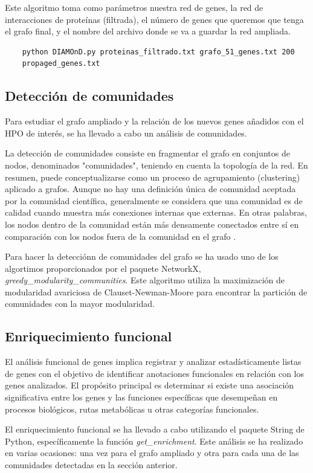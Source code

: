 Este algoritmo toma como parámetros nuestra red de genes, la red de interacciones de proteínas (filtrada), el número de genes que queremos que tenga el grafo final, y el nombre del archivo donde se va a guardar la red ampliada.

\begin{verbatim}
	python DIAMOnD.py proteinas_filtrado.txt grafo_51_genes.txt 200
	propaged_genes.txt
\end{verbatim}

\subsection{Detección de comunidades}

Para estudiar el grafo ampliado y la relación de los nuevos genes añadidos con el HPO de interés, se ha llevado a cabo un análisis de comunidades.

La detección de comunidades consiste en fragmentar el grafo en conjuntos de nodos, denominados "comunidades", teniendo en cuenta la topología de la red. En resumen, puede conceptualizarse como un proceso de agrupamiento (clustering) aplicado a grafos. Aunque no hay una definición única de comunidad aceptada por la comunidad científica, generalmente se considera que una comunidad es de calidad cuando muestra más conexiones internas que externas. En otras palabras, los nodos dentro de la comunidad están más densamente conectados entre sí en comparación con los nodos fuera de la comunidad en el grafo \cite{PanizoLledot}.

Para hacer la detecciónn de comunidades del grafo se ha usado uno de los algortimos proporcionados por el paquete NetworkX,\textit{ greedy\_modularity\_communities}. Este algoritmo utiliza la maximización de modularidad avariciosa de Clauset-Newman-Moore \cite{Clauset2004} para encontrar la partición de comunidades con la mayor modularidad.


\subsection{Enriquecimiento funcional}

El análisis funcional de genes implica registrar y analizar estadísticamente listas de genes con el objetivo de identificar anotaciones funcionales en relación con los genes analizados. El propósito principal es determinar si existe una asociación significativa entre los genes y las funciones específicas que desempeñan en procesos biológicos, rutas metabólicas u otras categorías funcionales. 

El enriquecimiento funcional se ha llevado a cabo utilizando el paquete String de Python, específicamente la función \textit{get\_enrichment}. Este análisis se ha realizado en varias ocasiones: una vez para el grafo ampliado y otra para cada una de las comunidades detectadas en la sección anterior.